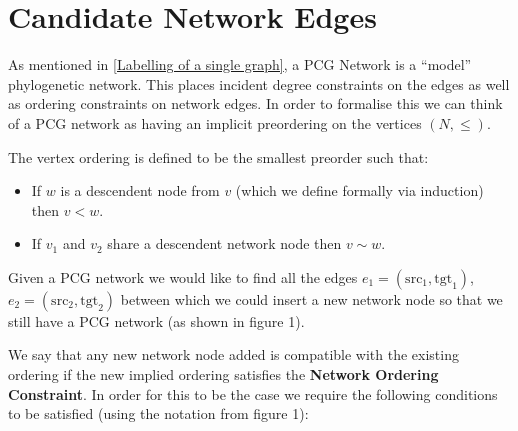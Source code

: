 \documentclass[11pt]{article}
\begin{document}
\newpage 

\section{Candidate Network Edges}\label{Candidate Network Edges}
 As mentioned in \ref{Labelling of a single graph}, a PCG Network is a ``model'' phylogenetic network. This places incident degree constraints on the edges as well as ordering constraints on network edges. In order to formalise this we can think of a PCG network as having an implicit preordering  on the vertices $(N, \leq )$. 


\vspace{2mm}
\begin{center}
\noindent{}
\end{center}

\noindent The vertex ordering is defined to be the smallest preorder such that:
\begin{itemize}
\item If $w$ is a descendent node from $v$ (which we define formally via induction) then $v < w$.
\item If $v_1$ and $v_2$ share a descendent network node then $v \sim w$.
\end{itemize}

\vspace{2mm}



\vspace{4mm}

Given a PCG network we would like to find all the edges $e_1= (\mathrm{src}_1, \mathrm{tgt}_1)$, $e_2 = (\mathrm{src}_2, \mathrm{tgt}_2)$ between which we could insert a new network node so that we still have a PCG network (as shown in figure 1).

We say that any new network node added is compatible with the existing ordering if the new implied ordering satisfies the \textbf{Network Ordering Constraint}. In order for this to be the case we require the following conditions to be satisfied (using the notation from figure 1):
\end{document}
